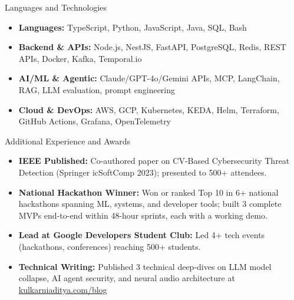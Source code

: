 \documentclass[]{mcdowellcv}
\begin{document}
\begin{cvsection}{Languages and Technologies}
  \begin{cvsubsection}{}{}{}
    \begin{itemize}
      \item \textbf{Languages:} TypeScript, Python, JavaScript, Java, SQL, Bash
      \item \textbf{Backend \& APIs:} Node.js, NestJS, FastAPI, PostgreSQL, Redis, REST APIs, Docker, Kafka, Temporal.io
      \item \textbf{AI/ML \& Agentic:} Claude/GPT-4o/Gemini APIs, MCP, LangChain, RAG, LLM evaluation, prompt engineering
      \item \textbf{Cloud \& DevOps:} AWS, GCP, Kubernetes, KEDA, Helm, Terraform, GitHub Actions, Grafana, OpenTelemetry
    \end{itemize}
  \end{cvsubsection}
\end{cvsection}

\begin{cvsection}{Additional Experience and Awards}
  \begin{cvsubsection}{}{}{}
    \begin{itemize}
      \item \textbf{IEEE Published:} Co-authored paper on CV-Based Cybersecurity Threat Detection (Springer icSoftComp 2023); presented to 500+ attendees.
      \item \textbf{National Hackathon Winner:} Won or ranked Top 10 in 6+ national hackathons spanning ML, systems, and developer tools; built 3 complete MVPs end-to-end within 48-hour sprints, each with a working demo.
      \item \textbf{Lead at Google Developers Student Club:} Led 4+ tech events (hackathons, conferences) reaching 500+ students.
      \item \textbf{Technical Writing:} Published 3 technical deep-dives on LLM model collapse, AI agent security, and neural audio architecture at \href{https://www.kulkarniaditya.com/blog}{kulkarniaditya.com/blog}
    \end{itemize}
  \end{cvsubsection}
\end{cvsection}
\end{document}

